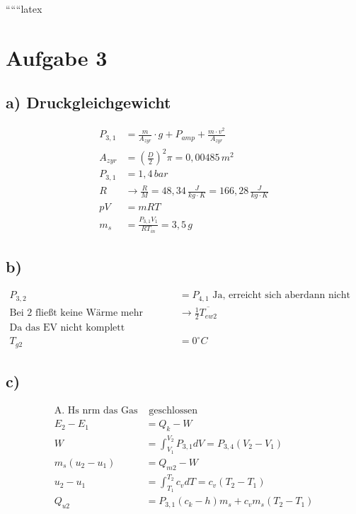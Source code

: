 
``````latex


\section*{Aufgabe 3}

\subsection*{a) Druckgleichgewicht}

\begin{align*}
P_{3,1} &= \frac{m}{A_{zyr}} \cdot g + P_{amp} + \frac{m \cdot v^2}{A_{zyr}} \\
A_{zyr} &= \left(\frac{D}{2}\right)^2 \pi = 0,00485 \, m^2 \\
P_{3,1} &= 1,4 \, bar \\
R &\rightarrow \frac{R}{M} = 48,34 \, \frac{J}{kg \cdot K} = 166,28 \, \frac{J}{kg \cdot K} \\
pV &= mRT \\
m_s &= \frac{P_{3,1} V_1}{R T_{in}} = 3,5 \, g
\end{align*}

\subsection*{b)}

\begin{align*}
P_{3,2} &= P_{4,1} \text{ Ja, erreicht sich aberdann nicht verändert hat. Durch sehr gleich.} \\
\text{Bei 2 fließt keine Wärme mehr} &\rightarrow \frac{1}{2} \overline{T_{ew2}} \\
\text{Da das EV nicht komplett geschlossen ist, bleibt dessen Temp konstant} \\
T_{g2} &= 0^\circ C
\end{align*}

\subsection*{c)}

\begin{align*}
\text{A. Hs nrm das Gas} &\text{ geschlossen} \\
E_2 - E_1 &= Q_k - W \\
W &= \int_{V_1}^{V_2} P_{3,1} dV = P_{3,4} (V_2 - V_1) \\
m_s (u_2 - u_1) &= Q_{m2} - W \\
u_2 - u_1 &= \int_{T_1}^{T_2} c_v dT = c_v (T_2 - T_1) \\
Q_{u2} &= P_{3,1} (c_k - h) m_s + c_v m_s (T_2 - T_1)
\end{align*}

